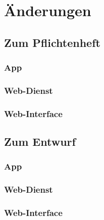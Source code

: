 \chapter{Änderungen} \label{chap:Aenderungen}
\section{Zum Pflichtenheft}

\subsection{App}

\subsection{Web-Dienst}

\subsection{Web-Interface}


\section{Zum Entwurf}

\subsection{App}

\subsection{Web-Dienst}

\subsection{Web-Interface}

